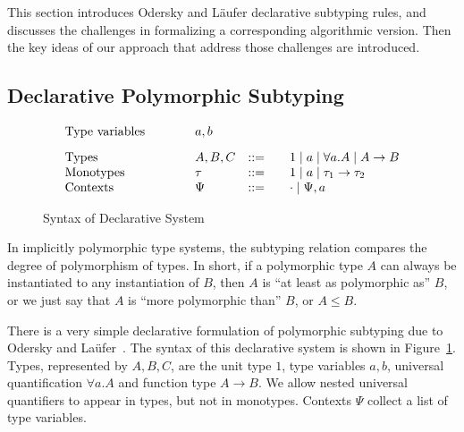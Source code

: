 
This section introduces Odersky and L\"aufer declarative subtyping rules, and discusses the challenges in formalizing a corresponding
algorithmic version. Then the key ideas of our approach that address
those challenges are introduced.


\begin{comment}
The subtyping relation is typically
used by the subsumption rule for type inference, e.g.
$$\inferrule*[right=Sub]
  {\Gamma\vdash t : A \quad A\le B}
  {\Gamma\vdash t : B}
$$
where $t$ represents a term, and the relation $\Gamma\vdash t : A$
reads ``term $t$ has type $A$ under context $\Gamma$''.
\end{comment}

\subsection{Declarative Polymorphic Subtyping}\label{declarative_subtyping}

\begin{figure}[t]
\[
\begin{array}{l@{\qquad}lcl}
\text{Type variables}\qquad&a, b\\[3mm]
\text{Types}\qquad&A, B, C &::=&\quad 1 \mid a \mid \forall a. A \mid A\to B\\
\text{Monotypes}\qquad&\tau &::=&\quad 1 \mid a \mid \tau_1\to \tau_2\\
\text{Contexts}\qquad&\Psi &::=&\quad \cdot \mid \Psi, a\\
\end{array}
\]
\caption{Syntax of Declarative System}\label{fig:decl:syntax}
\end{figure}


In implicitly polymorphic type systems, the subtyping relation
compares the degree of polymorphism of types. In short, if a
polymorphic type $A$ can always be instantiated to any instantiation
of $B$, then $A$ is ``at least as polymorphic as'' $B$, or we just say
that $A$ is ``more polymorphic than'' $B$, or $A\le B$.  

There is a very simple declarative formulation of
polymorphic subtyping due to Odersky and La\"ufer~\cite{odersky1996putting}. The syntax
of this declarative system is shown in Figure~\ref{fig:decl:syntax}. Types,
represented by $A, B, C$, are the unit type $1$, type variables
$a, b$, universal quantification $\forall a. A$ and function type
$A\to B$. We allow nested universal quantifiers to appear in
types, but not in monotypes. Contexts $\Psi$ collect a list
of type variables.


